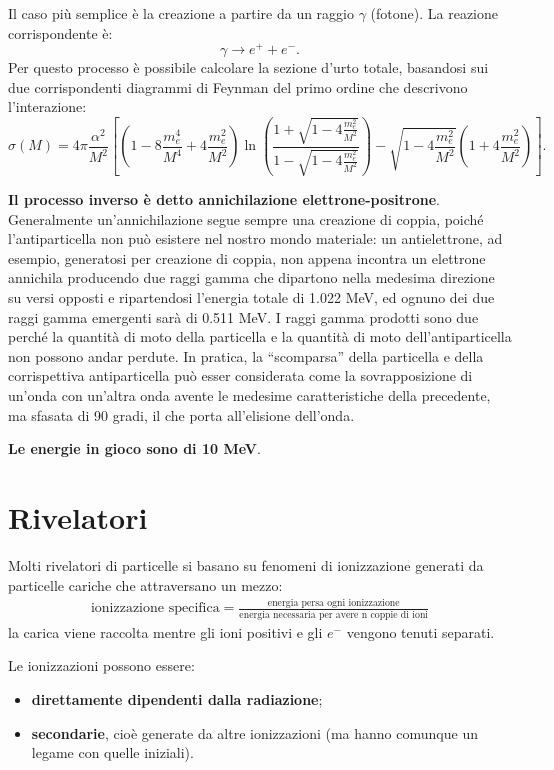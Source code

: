 \documentclass[a4paper,11pt,twoside,openany]{book}
\theoremstyle{definition}
\theoremstyle{plain}
\theoremstyle{plain}
\theoremstyle{definition}
\begin{document}
Il caso più semplice è la creazione a partire da un raggio $\gamma$ (fotone). La reazione corrispondente è:$$\gamma \longrightarrow e^{+} + e^{-}.$$ Per questo processo è possibile calcolare la sezione d'urto totale, basandosi sui due corrispondenti diagrammi di Feynman del primo ordine che descrivono l'interazione: $$\sigma (M) = 4 \pi \frac {\alpha^2}{M^2} \left [ \left (1-8 \frac {m_e^4}{M^4} + 4 \frac {m_e^2}{M^2} \right ) \ln \left ( \frac {1+ \sqrt {1-4 \frac {m_e^2}{M^2}}}{1- \sqrt {1-4 \frac {m_e^2}{M^2}}} \right ) - \sqrt {1-4 \frac {m_e^2}{M^2}} \left ( 1+4 \frac {m_e^2}{M^2} \right ) \right ].$$

\textbf{Il processo inverso è detto annichilazione elettrone-positrone}. Generalmente un'annichilazione segue sempre una creazione di coppia, poiché l'antiparticella non può esistere nel nostro mondo materiale: un antielettrone, ad esempio, generatosi per creazione di coppia, non appena incontra un elettrone annichila producendo due raggi gamma che dipartono nella medesima direzione su versi opposti e ripartendosi l'energia totale di 1.022 MeV, ed ognuno dei due raggi gamma emergenti sarà di 0.511 MeV. I raggi gamma prodotti sono due perché la quantità di moto della particella e la quantità di moto dell'antiparticella non possono andar perdute. In pratica, la ``scomparsa'' della particella e della corrispettiva antiparticella può esser considerata come la sovrapposizione di un'onda con un'altra onda avente le medesime caratteristiche della precedente, ma sfasata di 90 gradi, il che porta all'elisione dell'onda.

\textbf{Le energie in gioco sono di 10 MeV}.

\section{Rivelatori} %
Molti rivelatori di particelle si basano su fenomeni di ionizzazione generati da particelle cariche che attraversano un mezzo:
\begin{equation}\begin{split}
\textrm{ionizzazione specifica}=\frac{\textrm{energia persa ogni ionizzazione}}{\textrm{energia necessaria per avere n coppie di ioni}}
\end{split}\end{equation}
la carica viene raccolta mentre gli ioni positivi e gli $e^-$ vengono tenuti separati.

Le ionizzazioni possono essere:
\begin{itemize}
\item \textbf{direttamente dipendenti dalla radiazione};
\item \textbf{secondarie}, cioè generate da altre ionizzazioni (ma hanno comunque un legame con quelle iniziali).
\end{itemize}
\end{document}
